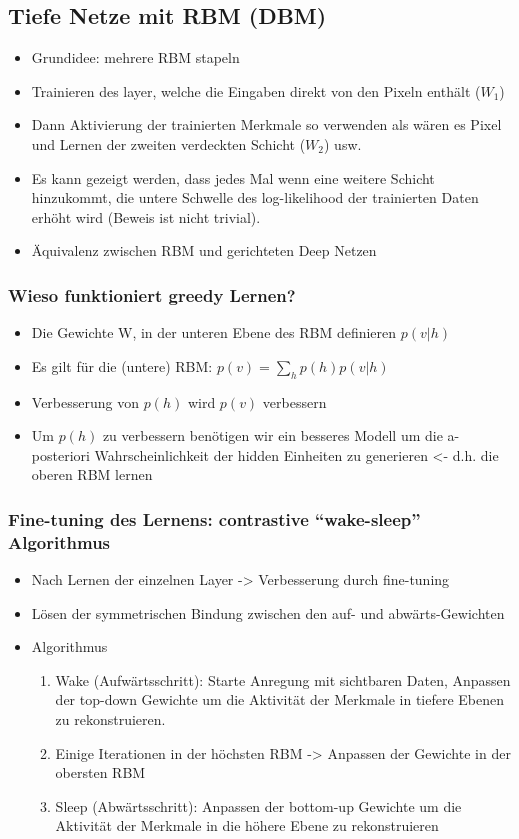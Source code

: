 \documentclass[paper=a4, fontsize=11pt]{scrartcl} %
\numberwithin{equation}{section} %
\numberwithin{figure}{section} %
\numberwithin{table}{section} %
\begin{document}
\subsection{Tiefe Netze mit RBM (DBM)}

\begin{itemize}
\item Grundidee: mehrere RBM stapeln
\item Trainieren des layer, welche die Eingaben direkt von den Pixeln enthält ($W_1$)
\item Dann Aktivierung der trainierten Merkmale so verwenden als wären es Pixel und Lernen der zweiten verdeckten Schicht ($W_2$) usw.
\item Es kann gezeigt werden, dass jedes Mal wenn eine weitere Schicht hinzukommt, die untere Schwelle des log-likelihood der trainierten Daten erhöht wird (Beweis ist nicht trivial).
\item Äquivalenz zwischen RBM und gerichteten Deep Netzen
\end{itemize}

\subsubsection{Wieso funktioniert greedy Lernen?}

\begin{itemize}
\item Die Gewichte W, in der unteren Ebene des RBM definieren $p(v|h)$
\item Es gilt für die (untere) RBM: $p(v) = \sum\limits_h p(h) p(v|h)$
\item Verbesserung von $p(h)$ wird $p(v)$ verbessern
\item Um $p(h)$ zu verbessern benötigen wir ein besseres Modell um die a-posteriori Wahrscheinlichkeit der hidden Einheiten zu generieren <- d.h. die oberen RBM lernen
\end{itemize}

\subsubsection{Fine-tuning des Lernens: contrastive ``wake-sleep'' Algorithmus}

\begin{itemize}
\item Nach Lernen der einzelnen Layer -> Verbesserung durch fine-tuning
\item Lösen der symmetrischen Bindung zwischen den auf- und abwärts-Gewichten
\item Algorithmus
\begin{enumerate}
\item Wake (Aufwärtsschritt): Starte Anregung mit sichtbaren Daten, Anpassen der top-down Gewichte um die Aktivität der Merkmale in tiefere Ebenen zu rekonstruieren.
\item Einige Iterationen in der höchsten RBM -> Anpassen der Gewichte in der obersten RBM
\item Sleep (Abwärtsschritt): Anpassen der bottom-up Gewichte um die Aktivität der Merkmale in die höhere Ebene zu rekonstruieren
\end{enumerate}
\end{itemize}
\end{document}
